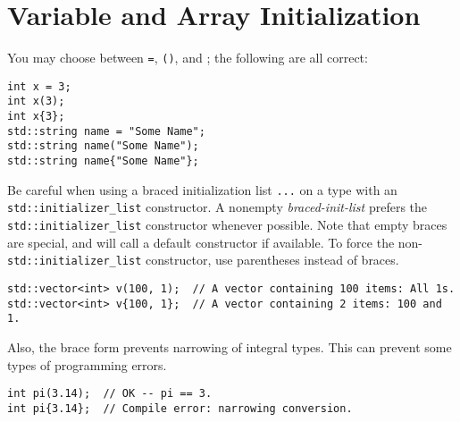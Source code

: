 
\section{Variable and Array Initialization}\label{sec:variable-and-array-initialization}
You may choose between \texttt{=}, \texttt{()}, and \texttt{{}}; the following are all correct:
\begin{verbatim}
int x = 3;
int x(3);
int x{3};
std::string name = "Some Name";
std::string name("Some Name");
std::string name{"Some Name"};
\end{verbatim}

Be careful when using a braced initialization list \texttt{{...}} on a type with an \texttt{std::initializer_list} constructor. A nonempty \emph{braced-init-list} prefers the \texttt{std::initializer_list} constructor whenever possible. Note that empty braces \texttt{{}} are special, and will call a default constructor if available. To force the non-\texttt{std::initializer_list} constructor, use parentheses instead of braces.

\begin{verbatim}
std::vector<int> v(100, 1);  // A vector containing 100 items: All 1s.
std::vector<int> v{100, 1};  // A vector containing 2 items: 100 and 1.
\end{verbatim}
Also, the brace form prevents narrowing of integral types. This can prevent some types of programming errors.

\begin{verbatim}
int pi(3.14);  // OK -- pi == 3.
int pi{3.14};  // Compile error: narrowing conversion.
\end{verbatim}
